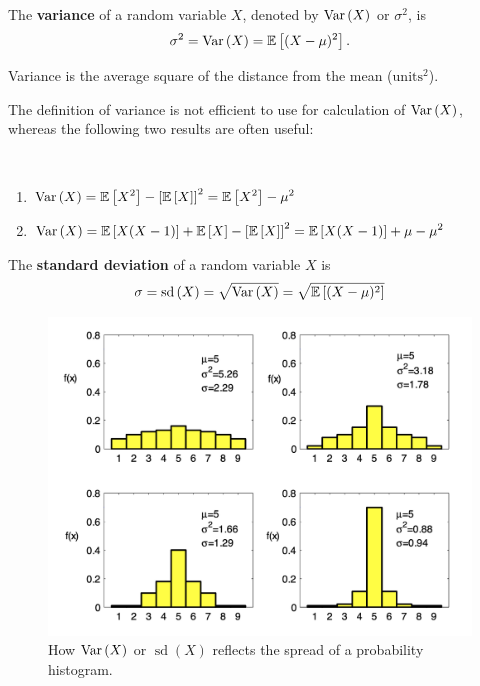 \begin{definition}
    The \textbf{variance} of a random variable $X$, denoted by $\operatorname{Var}\left({X}\right)$ or $\sigma^2$, is
    \[\sigma^2 = \operatorname{Var}\left({X}\right) = \mathbb{E}\left[{(X - \mu)^2}\right].\]
\end{definition}

\begin{note}
    Variance is the average square of the distance from the mean ($\text{units}^2$).
\end{note}

The definition of variance is not efficient to use for calculation of $\operatorname{Var}\left({X}\right)$, whereas
the following two results are often useful:
\begin{theorem}
    \phantom{}\
    \begin{enumerate}
        \item $\displaystyle \operatorname{Var}\left({X}\right) = \mathbb{E}\left[{X^2}\right] - \left[\mathbb{E}\left[{X}\right]\right]^2 = \mathbb{E}\left[{X^2}\right] - \mu^2$
        \item $\displaystyle \operatorname{Var}\left({X}\right) = \mathbb{E}\left[{X(X - 1)}\right] + \mathbb{E}\left[{X}\right] - \left[\mathbb{E}\left[{X}\right]\right]^2 = \mathbb{E}\left[{X(X - 1)}\right] + \mu - \mu^2$
    \end{enumerate}
\end{theorem}

\begin{definition}
    The \textbf{standard deviation} of a random variable $X$ is
    \[\sigma = \operatorname{sd}{(X)} = \sqrt{\operatorname{Var}\left({X}\right)} = \sqrt{\mathbb{E}\left[{(X - \mu)^2}\right]}\]
\end{definition}

\begin{figure}[htbp]
    \center
    \includegraphics[scale=0.55]{img/var-and-sd.png}
    \caption{How $\operatorname{Var}\left({X}\right)$ or $\operatorname{sd}(X)$ reflects the spread of a probability histogram.}
\end{figure}

